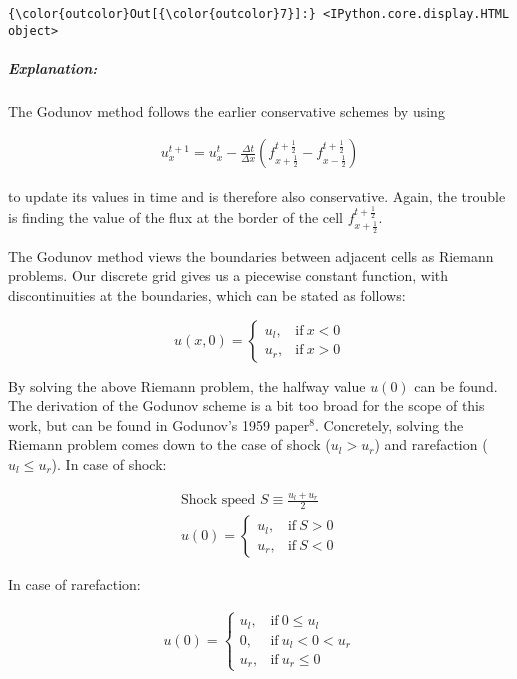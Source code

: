 \documentclass[11pt]{article}
\begin{document}
\begin{Verbatim}[commandchars=\\\{\}]
{\color{outcolor}Out[{\color{outcolor}7}]:} <IPython.core.display.HTML object>
\end{Verbatim}
            
    \subparagraph{Explanation:}\label{explanation}

The Godunov method follows the earlier conservative schemes by using

\begin{align}
    u_x^{t+1} = u_x^t -\frac{\Delta t}{\Delta x}\left(f_{x+\frac{1}{2}}^{t+\frac{1}{2}} - f_{x-\frac{1}{2}}^{t+\frac{1}{2}}\right)
\end{align}

to update its values in time and is therefore also conservative. Again,
the trouble is finding the value of the flux at the border of the cell
\(f_{x+\frac{1}{2}}^{t+\frac{1}{2}}\).

The Godunov method views the boundaries between adjacent cells as
Riemann problems. Our discrete grid gives us a piecewise constant
function, with discontinuities at the boundaries, which can be stated as
follows:

\begin{equation}
    u(x, 0)=
    \begin{cases}
      u_l, & \text{if}\ x<0 \\
      u_r, & \text{if}\ x>0
    \end{cases}
 \end{equation}

By solving the above Riemann problem, the halfway value \(u(0)\) can be
found. The derivation of the Godunov scheme is a bit too broad for the
scope of this work, but can be found in Godunov's 1959 paper\(^8\).
Concretely, solving the Riemann problem comes down to the case of shock
(\(u_l > u_r\)) and rarefaction (\(u_l \leq u_r\)). In case of shock:

\begin{align}
    \text{Shock speed } S \equiv \frac{u_l + u_r}{2}\\
    u(0)=
    \begin{cases}
      u_l, & \text{if}\ S > 0 \\
      u_r, & \text{if}\ S < 0
    \end{cases}
 \end{align}

In case of rarefaction:

\begin{align}
    u(0)=
    \begin{cases}
      u_l, & \text{if}\ 0 \leq u_l \\
      0,   & \text{if}\ u_l < 0 < u_r \\
      u_r, & \text{if}\ u_r \leq 0
    \end{cases}
 \end{align}
\end{document}
